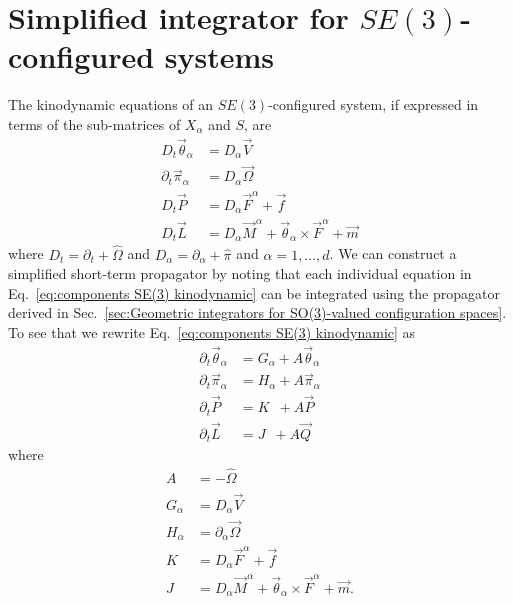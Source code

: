 \documentclass[]{cam-thesis}
\begin{document}
\section{Simplified integrator for $SE(3)$-configured systems} \label{app:Simplified integrator for SE(3)-configured systems}

The kinodynamic equations of an $SE(3)$-configured system, if expressed in terms of the sub-matrices of $X_\alpha$ and $S$, are
\begin{subequations}  \label{eq:components SE(3) kinodynamic}
\begin{align}
D_t \vec{\theta}_\alpha & = D_\alpha \vec{V} \\
\partial_t \vec{\pi}_\alpha & = D_\alpha \vec{\Omega} \\
D_t \vec{P} & = D_\alpha \vec{F}^\alpha + \vec{f}  \\
D_t \vec{L} & = D_\alpha \vec{M}^\alpha + \vec{\theta}_\alpha \times \vec{F}^\alpha + \vec{m}
\end{align}
\end{subequations}
where $D_t = \partial_t + \hat{\Omega}$ and $D_\alpha = \partial_\alpha + \hat{\pi}$ and $\alpha = 1,\dots,d$. We can construct a simplified short-term propagator by noting that each individual equation in Eq.~\ref{eq:components SE(3) kinodynamic} can be integrated using the propagator derived in Sec.~\ref{sec:Geometric integrators for SO(3)-valued configuration spaces}. To see that we rewrite Eq.~\ref{eq:components SE(3) kinodynamic} as
\begin{subequations}  \label{eq:components SE(3) kinodynamic rewritten}
\begin{align}
\partial_t \vec{\theta}_\alpha & = G_\alpha + A \vec{\theta}_\alpha \\
\partial_t \vec{\pi}_\alpha & = H_\alpha + A \vec{\pi}_\alpha \\
\partial_t \vec{P}_{\phantom{\alpha}} & = K_{\phantom{\alpha}} + A \vec{P} \\
\partial_t \vec{L}_{\phantom{\alpha}} & = J_{\phantom{\alpha}} + A \vec{Q}
\end{align}
\end{subequations}
where
\begin{subequations} 
\begin{align}
A_{\phantom{\alpha}} & = - \hat{\Omega} \\
G_\alpha & = D_\alpha \vec{V} \\
H_\alpha & = \partial_\alpha \vec{\Omega} \\
K_{\phantom{\alpha}} & = D_\alpha \vec{F}^\alpha + \vec{f} \\
J_{\phantom{\alpha}} & = D_\alpha \vec{M}^\alpha + \vec{\theta}_\alpha \times \vec{F}^\alpha + \vec{m}.
\end{align}
\end{subequations}
\end{document}
